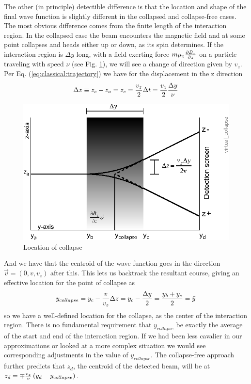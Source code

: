 \documentclass[aps,prl,superscriptaddress,12pt]{revtex4-2}
\begin{document}
The other (in principle) detectible difference is that the location and shape of the final wave function 
	is slightly different in the collapsed and collapse-free cases. 
The most obvious difference comes from the finite length of the interaction region. 
In the collapsed case the beam encounters the magnetic field 
	and at some point collapses and heads either up or down, 
	as its spin determines. 
If the interaction region is $\Delta y$ long, with a field exerting force 
$m\mu_z{{\partial B_z} \over {\partial z}}$
on a particle traveling with speed $\nu$ (see Fig. \ref{fig:virtual:collapse}), 
we will see a change of direction given by 
$v_z$.
Per Eq. (\ref{eq:classical:trajectory}) we have for the displacement in the z direction
\begin{equation}
\Delta z\equiv z_c-z_a=z_c={{v_z} \over 2}\Delta t={{v_z} \over 2}{{\Delta y} \over \nu }
\end{equation}

\begin{figure}
\includegraphics{virtual_collapse_small.eps}	
\caption{\label{fig:virtual:collapse} {Location of collapse}}
\end{figure}

And we have that the centroid of the wave function goes in the direction  $\vec v=(0,v,v_z)$ after this. 
This lets us backtrack the resultant course, giving an effective location for the point of collapse as
\begin{equation}
y_{collapse}=y_c-{v \over {v_z}}\Delta z=y_c-{{\Delta y} \over 2}={{y_b+y_c} \over 2}=\bar y
\end{equation}
so we have a well-defined location for the collapse, as the center of the interaction region. 
There is no fundamental requirement that $y_{collapse}$
	be exactly the average of the start and end of the interaction region. 
If we had been less cavalier in our approximations or looked at a more complex situation 
	we would see corresponding adjustments in the value of $y_{collapse}$.
The collapse-free approach further predicts that $z_d$, 
	the centroid of the detected beam, 
	will be at  
$z_d=\mp {{v_z} \over v}\left( {y_d-y_{collapse}} \right)$. 
\end{document}
